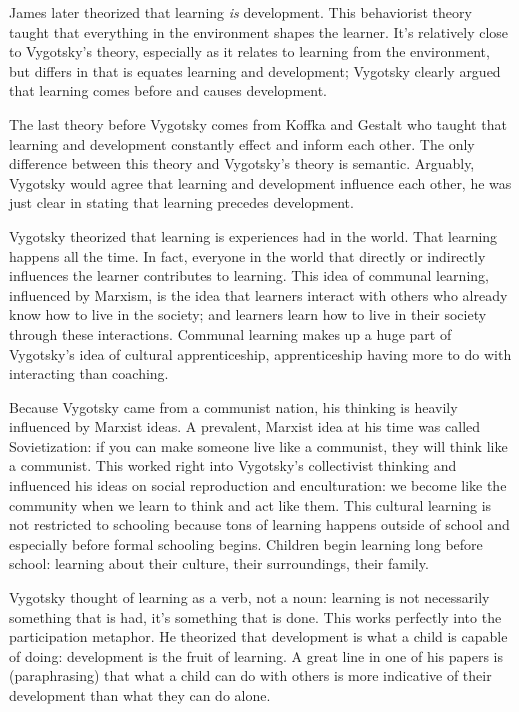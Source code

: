 \documentclass[12pt]{article}
\begin{document}
James later theorized that learning \emph{is} development. This behaviorist theory taught that everything in the environment shapes the learner. It's relatively close to Vygotsky's theory, especially as it relates to learning from the environment, but differs in that is equates learning and development; Vygotsky clearly argued that learning comes before and causes development.

The last theory before Vygotsky comes from Koffka and Gestalt who taught that learning and development constantly effect and inform each other. The only difference between this theory and Vygotsky's theory is semantic. Arguably, Vygotsky would agree that learning and development influence each other, he was just clear in stating that learning precedes development.

Vygotsky theorized that learning is experiences had in the world. That learning happens all the time. In fact, everyone in the world that directly or indirectly influences the learner contributes to learning. This idea of communal learning, influenced by Marxism, is the idea that learners interact with others who already know how to live in the society; and learners learn how to live in their society through these interactions. Communal learning makes up a huge part of Vygotsky's idea of cultural apprenticeship, apprenticeship having more to do with interacting than coaching.

Because Vygotsky came from a communist nation, his thinking is heavily influenced by Marxist ideas. A prevalent, Marxist idea at his time was called Sovietization: if you can make someone live like a communist, they will think like a communist. This worked right into Vygotsky's collectivist thinking and influenced his ideas on social reproduction and enculturation: we become like the community when we learn to think and act like them. This cultural learning is not restricted to schooling because tons of learning happens outside of school and especially before formal schooling begins. Children begin learning long before school: learning about their culture, their surroundings, their family.

Vygotsky thought of learning as a verb, not a noun: learning is not necessarily something that is had, it's something that is done. This works perfectly into the participation metaphor. He theorized that development is what a child is capable of doing: development is the fruit of learning. A great line in one of his papers is (paraphrasing) that what a child can do with others is more indicative of their development than what they can do alone.
\end{document}
